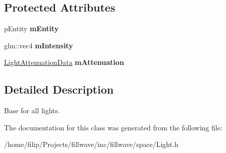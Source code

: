 \subsection*{Protected Attributes}
\begin{DoxyCompactItemize}
\item 
\hypertarget{classfillwave_1_1space_1_1Light_a009157c29e3454b5893193fd3b796de1}{}p\+Entity {\bfseries m\+Entity}\label{classfillwave_1_1space_1_1Light_a009157c29e3454b5893193fd3b796de1}

\item 
\hypertarget{classfillwave_1_1space_1_1Light_ae52787955cd7c59c36e97b164a66843e}{}glm\+::vec4 {\bfseries m\+Intensity}\label{classfillwave_1_1space_1_1Light_ae52787955cd7c59c36e97b164a66843e}

\item 
\hypertarget{classfillwave_1_1space_1_1Light_ae095ec945b6b1ba28d36c3ef923c7189}{}\hyperlink{structfillwave_1_1space_1_1LightAttenuationData}{Light\+Attenuation\+Data} {\bfseries m\+Attenuation}\label{classfillwave_1_1space_1_1Light_ae095ec945b6b1ba28d36c3ef923c7189}

\end{DoxyCompactItemize}


\subsection{Detailed Description}
Base for all lights. 

The documentation for this class was generated from the following file\+:\begin{DoxyCompactItemize}
\item 
/home/filip/\+Projects/fillwave/inc/fillwave/space/Light.\+h\end{DoxyCompactItemize}
